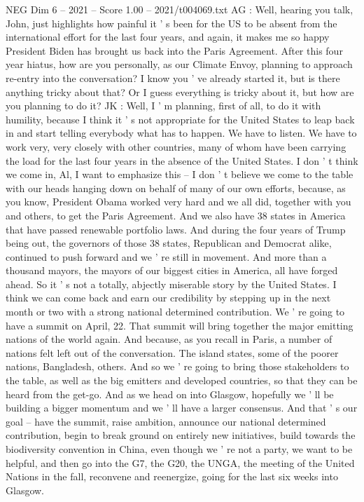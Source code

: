 \begin{textsample}{NEG Dim 6 – 2021 – Score 1.00 – 2021/t004069.txt}
AG : Well, hearing you talk, John, just highlights how painful it ' s been for the US to be absent from the international effort for the last four years, and again, it makes me so happy President Biden has brought us back into the Paris Agreement.
After this four year hiatus, how are you personally, as our Climate Envoy, planning to approach re-entry into the conversation?
I know you ' ve already started it, but is there anything tricky about that?
Or I guess everything is tricky about it, but how are you planning to do it?
JK : Well, I ' m planning, first of all, to do it with humility, because I think it ' s not appropriate for the United States to leap back in and start telling everybody what has to happen.
We have to listen.
We have to work very, very closely with other countries, many of whom have been carrying the load for the last four years in the absence of the United States.
I don ' t think we come in, Al, I want to emphasize this -- I don ' t believe we come to the table with our heads hanging down on behalf of many of our own efforts, because, as you know, President Obama worked very hard and we all did, together with you and others, to get the Paris Agreement.
And we also have 38 states in America that have passed renewable portfolio laws.
And during the four years of Trump being out, the governors of those 38 states, Republican and Democrat alike, continued to push forward and we ' re still in movement.
And more than a thousand mayors, the mayors of our biggest cities in America, all have forged ahead.
So it ' s not a totally, abjectly miserable story by the United States.
I think we can come back and earn our credibility by stepping up in the next month or two with a strong national determined contribution.
We ' re going to have a summit on April, 22.
That summit will bring together the major emitting nations of the world again.
And because, as you recall in Paris, a number of nations felt left out of the conversation.
The island states, some of the poorer nations, Bangladesh, others.
And so we ' re going to bring those stakeholders to the table, as well as the big emitters and developed countries, so that they can be heard from the get-go.
And as we head on into Glasgow, hopefully we ' ll be building a bigger momentum and we ' ll have a larger consensus.
And that ' s our goal -- have the summit, raise ambition, announce our national determined contribution, begin to break ground on entirely new initiatives, build towards the biodiversity convention in China, even though we ' re not a party, we want to be helpful, and then go into the G7, the G20, the UNGA, the meeting of the United Nations in the fall, reconvene and reenergize, going for the last six weeks into Glasgow.

\end{textsample}
